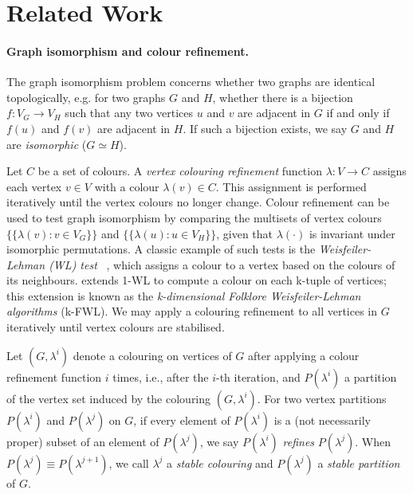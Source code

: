 \section{Related Work}
\paragraph{Graph isomorphism and colour refinement.} 
The graph isomorphism problem concerns whether two graphs are identical topologically, e.g. for two graphs $G$ and $H$, whether there is a bijection $f:V_G \rightarrow V_H$ such that any two vertices $u$ and $v$ are adjacent in $G$ if and only if $f(u)$ and $f(v)$ are adjacent in $H$. If such a bijection exists, we say $G$ and $H$ are \emph{isomorphic} ($G\simeq H$).

Let $C$ be a set of colours. A \emph{vertex colouring refinement} function $\lambda: V \rightarrow C$ assigns each vertex $v\in V$ with a colour $\lambda(v)\in C$. This assignment is performed iteratively until the vertex colours no longer change. Colour refinement can be used to test graph isomorphism by comparing the multisets of vertex colours $\{\!\!\{\lambda(v): v\in V_G\}\!\!\}$ and $\{\!\!\{\lambda(u): u\in V_H\}\!\!\}$, given that $\lambda(\cdot)$ is invariant under isomorphic permutations. A classic example of such tests is the \emph{Weisfeiler-Lehman (WL) test} ~\citep{weisfeiler1968reduction}, which assigns a colour to a vertex based on the colours of its neighbours.
\citet{cai1992optimal} extends 1-WL to compute a colour on each k-tuple of vertices; this extension is known as the \emph{k-dimensional Folklore Weisfeiler-Lehman algorithms} (k-FWL).
We may apply a colouring refinement to all vertices in $G$ iteratively until vertex colours are stabilised. 

Let $(G,\lambda^i)$ denote a colouring on vertices of $G$ after applying a colour refinement function $i$ times, i.e., after the $i$-th iteration, and $P(\lambda^i)$ a partition of the vertex set induced by the colouring $(G,\lambda^i)$. For two vertex partitions $P(\lambda^i)$ and $P(\lambda^j)$ on $G$, if every element
of $P(\lambda^i)$ is a (not necessarily proper) subset of an element of $P(\lambda^j)$, we say $P(\lambda^i)$ \emph{refines} $P(\lambda^j)$. 
When $P(\lambda^{j})\equiv P(\lambda^{j+1})$, we call $\lambda^j$ a \emph{stable colouring} and $P(\lambda^{j})$ a \emph{stable partition} of $G$.


